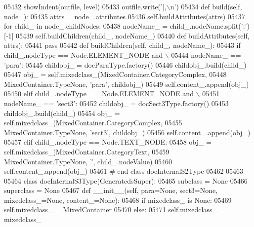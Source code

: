 \begin{DoxyCode}
{{{{{{{{{{{{{{{{{{{{{{{{{{{{{{{{{{{{{{{{{{{{{{{{{{{{{{{{{{{{{{{{{{{{{{{{{{{{{{{{{{{{{{{{{{{{{{{{{{{{{{{{{{{{{{{{{{{{{{{{{{{{{{{{{{{{{{{{{{{{{{{{{{{{{{{{{{{{{{{{{{{{{{{{{{{{{{{{{{{{{{{{{{{{{{{{{{{{{{{{{{{{{{{{{{{{{{{{{{{{{{{{{{{{{{{{{{{{{{{{{{{{{{{{{{{{{{{{{{{{{{{{{{{{{{{{{{{{{{{{{{{{{{{{{{{{{{{{{{{{{{{{{{{{{{{{{{{{{{{{{{{{{{{{{{{{{{{{{{{{{{05432         showIndent(outfile, level)
05433         outfile.write(\textcolor{stringliteral}{'],\(\backslash\)n'})
05434     \textcolor{keyword}{def }build(self, node\_):
05435         attrs = node\_.attributes
05436         self.buildAttributes(attrs)
05437         \textcolor{keywordflow}{for} child\_ \textcolor{keywordflow}{in} node\_.childNodes:
05438             nodeName\_ = child\_.nodeName.split(\textcolor{stringliteral}{':'})[-1]
05439             self.buildChildren(child\_, nodeName\_)
05440     \textcolor{keyword}{def }buildAttributes(self, attrs):
05441         \textcolor{keywordflow}{pass}
05442     \textcolor{keyword}{def }buildChildren(self, child\_, nodeName\_):
05443         \textcolor{keywordflow}{if} child\_.nodeType == Node.ELEMENT\_NODE \textcolor{keywordflow}{and} \(\backslash\)
05444             nodeName\_ == \textcolor{stringliteral}{'para'}:
05445             childobj\_ = docParaType.factory()
05446             childobj\_.build(child\_)
05447             obj\_ = self.mixedclass\_(MixedContainer.CategoryComplex,
05448                 MixedContainer.TypeNone, \textcolor{stringliteral}{'para'}, childobj\_)
05449             self.content\_.append(obj\_)
05450         \textcolor{keywordflow}{elif} child\_.nodeType == Node.ELEMENT\_NODE \textcolor{keywordflow}{and} \(\backslash\)
05451             nodeName\_ == \textcolor{stringliteral}{'sect3'}:
05452             childobj\_ = docSect3Type.factory()
05453             childobj\_.build(child\_)
05454             obj\_ = self.mixedclass\_(MixedContainer.CategoryComplex,
05455                 MixedContainer.TypeNone, \textcolor{stringliteral}{'sect3'}, childobj\_)
05456             self.content\_.append(obj\_)
05457         \textcolor{keywordflow}{elif} child\_.nodeType == Node.TEXT\_NODE:
05458             obj\_ = self.mixedclass\_(MixedContainer.CategoryText,
05459                 MixedContainer.TypeNone, \textcolor{stringliteral}{''}, child\_.nodeValue)
05460             self.content\_.append(obj\_)
05461 \textcolor{comment}{# end class docInternalS2Type}
05462 
05463 
05464 \textcolor{keyword}{class }docInternalS3Type(GeneratedsSuper):
05465     subclass = \textcolor{keywordtype}{None}
05466     superclass = \textcolor{keywordtype}{None}
05467     \textcolor{keyword}{def }__init__(self, para=None, sect3=None, mixedclass\_=None, content\_=None):
05468         \textcolor{keywordflow}{if} mixedclass\_ \textcolor{keywordflow}{is} \textcolor{keywordtype}{None}:
05469             self.mixedclass_ = MixedContainer
05470         \textcolor{keywordflow}{else}:
05471             self.mixedclass_ = mixedclass\_
}}}}}}}}}}}}}}}}}}}}}}}}}}}}}}}}}}}}}}}}}}}}}}}}}}}}}}}}}}}}}}}}}}}}}}}}}}}}}}}}}}}}}}}}}}}}}}}}}}}}}}}}}}}}}}}}}}}}}}}}}}}}}}}}}}}}}}}}}}}}}}}}}}}}}}}}}}}}}}}}}}}}}}}}}}}}}}}}}}}}}}}}}}}}}}}}}}}}}}}}}}}}}}}}}}}}}}}}}}}}}}}}}}}}}}}}}}}}}}}}}}}}}}}}}}}}}}}}}}}}}}}}}}}}}}}}}}}}}}}}}}}}}}}}}}}}}}}}}}}}}}}}}}}}}}}}}}}}}}}}}}}}}}}}}}}}}}}}}}}}}}
\end{DoxyCode}
